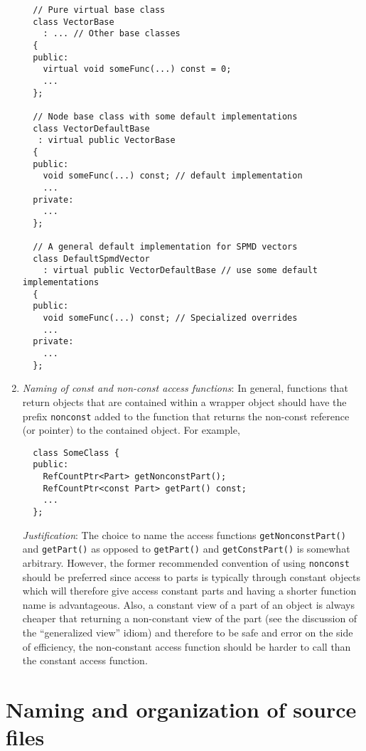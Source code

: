 \begin{enumerate}
{\small\begin{verbatim}
  // Pure virtual base class 
  class VectorBase
    : ... // Other base classes
  {
  public:
    virtual void someFunc(...) const = 0;
    ...
  };

  // Node base class with some default implementations
  class VectorDefaultBase
   : virtual public VectorBase
  {
  public:
    void someFunc(...) const; // default implementation
    ...
  private:
    ...
  };

  // A general default implementation for SPMD vectors
  class DefaultSpmdVector
    : virtual public VectorDefaultBase // use some default implementations
  {
  public:
    void someFunc(...) const; // Specialized overrides
    ...
  private:
    ...
  };
\end{verbatim}}

{}\item\textit{Naming of const and non-const access functions}: In general,
functions that return objects that are contained within a wrapper object
should have the prefix {}\texttt{nonconst} added to the function that returns
the non-const reference (or pointer) to the contained object.  For example,

{\small\begin{verbatim}
  class SomeClass {
  public:
    RefCountPtr<Part> getNonconstPart();
    RefCountPtr<const Part> getPart() const;
    ...
  };
\end{verbatim}}

{}\textit{Justification}: The choice to name the access functions
{}\texttt{getNonconstPart()} and {}\texttt{getPart()} as opposed to
{}\texttt{getPart()} and {}\texttt{getConstPart()} is somewhat arbitrary.
However, the former recommended convention of using {}\texttt{nonconst} should
be preferred since access to parts is typically through constant objects which
will therefore give access constant parts and having a shorter function name
is advantageous.  Also, a constant view of a part of an object is always
cheaper that returning a non-constant view of the part (see the discussion of
the ``generalized view'' idiom) and therefore to be safe and error on the side
of efficiency, the non-constant access function should be harder to call than
the constant access function.

\end{enumerate}

%
\section{Naming and organization of source files}
%

